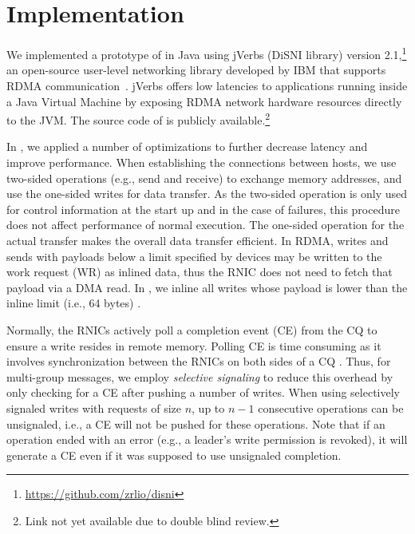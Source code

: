 \section{Implementation}
\label{sec:implementation}

%

We implemented a prototype of \libname in Java using jVerbs (DiSNI
library) version 2.1,\footnote{\url{https://github.com/zrlio/disni}} an
open-source user-level networking library developed by IBM that supports RDMA
communication~\cite{stuedi2013jverbs}. jVerbs offers low latencies to applications running inside a Java
Virtual Machine by exposing RDMA network hardware resources directly to the JVM.
The source code of \libname is publicly available.\footnote{Link not yet available due to double blind review.}

In \libname, we applied a number of optimizations to further decrease latency
and improve performance. When establishing the connections between hosts, we
use two-sided operations (e.g., send and receive) to exchange memory addresses, and
use the one-sided writes for data transfer. As the two-sided operation is only
used for control information at the start up and in the case of failures, this procedure
does not affect performance of normal execution.
The one-sided operation for the actual
transfer makes the overall data transfer efficient. In RDMA, writes and sends
with payloads below a limit specified by devices may be written to the work
request (WR) as inlined data, thus the RNIC does not need to fetch that payload
via a DMA read. In \libname, we inline all writes whose payload is lower than
the inline limit (i.e., 64 bytes) \cite{mitchell2013using}.

Normally, the RNICs actively poll a completion event (CE) from the CQ to ensure
a write resides in remote memory. Polling CE is time consuming as it involves
synchronization between the RNICs on both sides of a CQ \cite{APUS}. Thus,
for multi-group messages, we
employ \emph{selective signaling} \cite{kalia2014using} to reduce this overhead by
only checking for a CE after pushing a number of writes. When using 
selectively signaled writes with requests of size $n$, up to $n-1$ consecutive
operations can be unsignaled, i.e., a CE will not be pushed for these
operations. Note that if an operation ended with an error (e.g., a leader's
write permission is revoked), it will generate a CE even if it was supposed to use
unsignaled completion.

